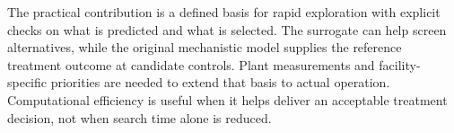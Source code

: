 The practical contribution is a defined basis for rapid exploration with explicit checks on what is predicted and what is selected. The surrogate can help screen alternatives, while the original mechanistic model supplies the reference treatment outcome at candidate controls. Plant measurements and facility-specific priorities are needed to extend that basis to actual operation. Computational efficiency is useful when it helps deliver an acceptable treatment decision, not when search time alone is reduced.

